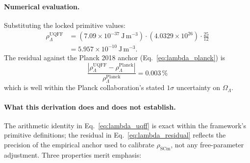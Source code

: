 \paragraph{Numerical evaluation.} Substituting the locked primitive values:
\begin{align}
\rho_\Lambda^{\text{UQFF}}
  &= \left(7.09\times 10^{-37}\ \mathrm{J\,m^{-3}}\right) \cdot
     \left(4.0329 \times 10^{26}\right) \cdot \frac{25}{12} \nonumber \\[2pt]
  &= 5.957\times 10^{-10}\ \mathrm{J\,m^{-3}}.
\label{eq:lambda_numerical}
\end{align}
The residual against the Planck 2018 anchor
(Eq.~\ref{eq:lambda_planck}) is
\begin{equation}
\frac{\left|\rho_\Lambda^{\text{UQFF}} - \rho_\Lambda^{\text{Planck}}\right|}
     {\rho_\Lambda^{\text{Planck}}} = 0.003\,\%
\label{eq:lambda_residual}
\end{equation}
which is well within the Planck collaboration's stated
$1\sigma$ uncertainty on $\Omega_\Lambda$.

\paragraph{What this derivation does and does not establish.}
The arithmetic identity in Eq.~\ref{eq:lambda_uqff} is exact within the
framework's primitive definitions; the residual in
Eq.~\ref{eq:lambda_residual} reflects the precision of the empirical
anchor used to calibrate $\rho_{\text{SCm}}$, not any free-parameter
adjustment. Three properties merit emphasis:

